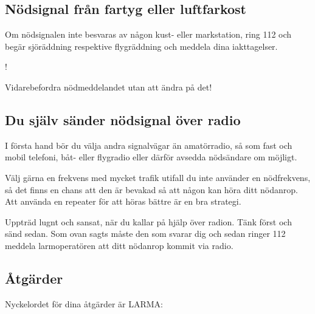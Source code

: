 \subsection{Nödsignal från fartyg eller luftfarkost}

Om nödsignalen inte besvaras av någon kust- eller markstation, ring 112
och begär sjöräddning respektive flygräddning och meddela dina iakttagelser.

\begin{center}
\begin{minipage}{0.19\columnwidth}
\Huge{\Huge{\hspace{1ex}!}}
\end{minipage}
\begin{minipage}{0.7\columnwidth}
Vidarebefordra nödmeddelandet utan att ändra på det!
\end{minipage}
\end{center}

\subsection{Du själv sänder nödsignal över radio}

I första hand bör du välja andra signalvägar än amatörradio, så som fast och
mobil telefoni, båt- eller flygradio eller därför avsedda nödsändare om möjligt.

Välj gärna en frekvens med mycket trafik utifall du inte använder en
nödfrekvens, så det finns en chans att den är bevakad så att någon kan höra
ditt nödanrop.
Att använda en repeater för att höras bättre är en bra strategi.

Uppträd lugnt och sansat, när du kallar på hjälp över radion.
Tänk först och sänd sedan.
Som ovan sagts måste den som svarar dig och sedan ringer 112 meddela
larmoperatören att ditt nödanrop kommit via radio.

\subsection{Åtgärder}

Nyckelordet för dina åtgärder är LARMA:

